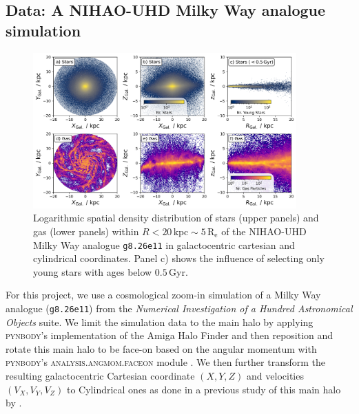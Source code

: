 \documentclass[twocolumn,apj,numberedappendix,appendixfloats]{openjournal}
\newcommand{\nihaoAGEmax}{$0.5\,\mathrm{Gyr}$}
\begin{document}
\begin{CJK*}{UTF8}{gbsn}
\section{Data: A NIHAO-UHD Milky Way analogue simulation} \label{sec:data}

\begin{figure}
    \centering
    \includegraphics[width=0.9\textwidth]{figures/stars_and_gas_overview.png}
    \caption{Logarithmic spatial density distribution of stars (upper panels) and gas (lower panels) within $R < 20\,\mathrm{kpc} \sim 5\,\mathrm{R_e}$ of the NIHAO-UHD Milky Way analogue \texttt{g8.26e11} in galactocentric cartesian and cylindrical coordinates. Panel c) shows the influence of selecting only young stars with ages below \nihaoAGEmax.}
    \label{fig:stars_and_gas_overview}
\end{figure}

For this project, we use a cosmological zoom-in simulation of a Milky Way analogue (\texttt{g8.26e11}) from the \textit{Numerical Investigation of a Hundred Astronomical Objects} \citep[NIHAO,][]{Wang2015} suite. We limit the simulation data to the main halo by applying \textsc{pynbody}'s implementation of the Amiga Halo Finder \citep{Knollman2009} and then reposition and rotate this main halo to be face-on based on the angular momentum with \textsc{pynbody}'s \textsc{analysis.angmom.faceon} module \citep{pynbody}. We then further transform the resulting galactocentric Cartesian coordinate $(X,Y,Z)$ and velocities $(V_X,V_Y,V_Z)$ to Cylindrical ones as done in a previous study of this main halo by \citet{Buder2024}.


\end{CJK*}
\end{document}
